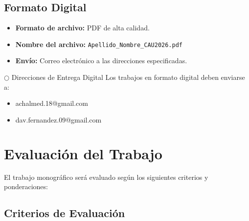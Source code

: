 \documentclass[12pt,a4paper]{article}
\begin{document}


\subsection{Formato Digital}

\begin{itemize}
  \item \textbf{Formato de archivo:} PDF de alta calidad.
  \item \textbf{Nombre del archivo:} \texttt{Apellido\_Nombre\_CAU2026.pdf}
  \item \textbf{Envío:} Correo electrónico a las direcciones especificadas.
\end{itemize}

\begin{infobox}{$\bigcirc$ Direcciones de Entrega Digital}
  Los trabajos en formato digital deben enviarse a:
  \begin{itemize}
    \item achalmed.18@gmail.com
    \item dav.fernandez.09@gmail.com
  \end{itemize}
\end{infobox}

\section{Evaluación del Trabajo}

El trabajo monográfico será evaluado según los siguientes criterios y ponderaciones:

\subsection{Criterios de Evaluación}
\end{document}

